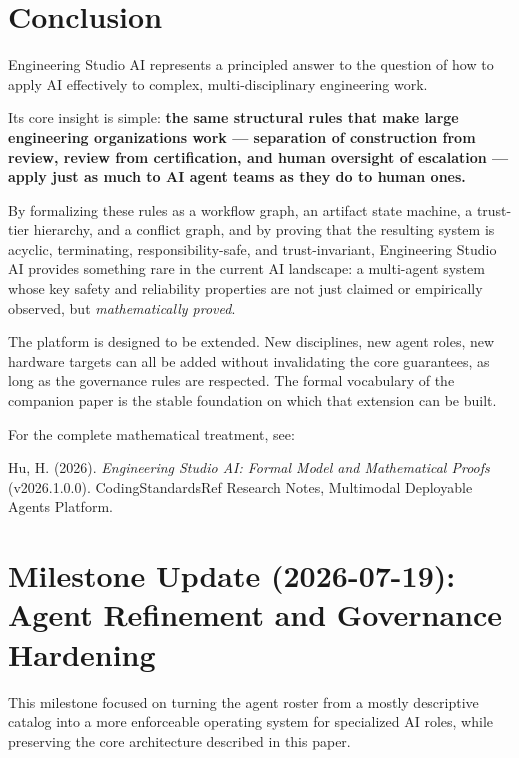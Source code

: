\documentclass[12pt]{article}
\begin{document}
\section{Conclusion}
\label{sec:conclusion}

Engineering Studio AI represents a principled answer to the question
of how to apply AI effectively to complex, multi-disciplinary
engineering work.

Its core insight is simple: \textbf{the same structural rules that
make large engineering organizations work --- separation of
construction from review, review from certification, and human
oversight of escalation --- apply just as much to AI agent teams as
they do to human ones.}

By formalizing these rules as a workflow graph, an artifact state
machine, a trust-tier hierarchy, and a conflict graph, and by proving
that the resulting system is acyclic, terminating, responsibility-safe,
and trust-invariant, Engineering Studio AI provides something rare in
the current AI landscape: a multi-agent system whose key safety and
reliability properties are not just claimed or empirically observed,
but \emph{mathematically proved}.

The platform is designed to be extended.
New disciplines, new agent roles, new hardware targets can all be
added without invalidating the core guarantees, as long as the
governance rules are respected.
The formal vocabulary of the companion paper is the stable foundation
on which that extension can be built.

\bigskip
\noindent
For the complete mathematical treatment, see:
\medskip

\noindent
Hu, H. (2026).
\textit{Engineering Studio AI: Formal Model and Mathematical Proofs}
(v2026.1.0.0).
CodingStandardsRef Research Notes, Multimodal Deployable Agents Platform.

\newpage
\section{Milestone Update (2026-07-19): Agent Refinement and Governance Hardening}
\label{sec:milestone-update-20260719}

This milestone focused on turning the agent roster from a mostly
descriptive catalog into a more enforceable operating system for
specialized AI roles, while preserving the core architecture described
in this paper.
\end{document}
